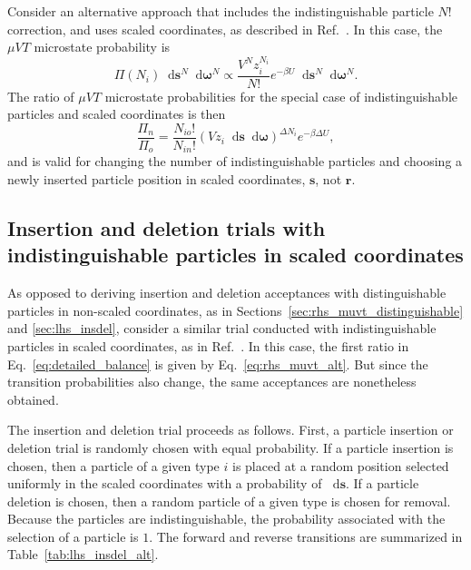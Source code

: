 \documentclass[
  9pt,
  bestpractices,
  pubversion,
]{livecoms}
\newcommand*\diff{\mathop{}\!\mathrm{d}}
\begin{document}
Consider an alternative approach that includes the indistinguishable particle $N!$ correction, and uses scaled coordinates, as described in Ref.~\cite{frenkel_understanding_2002}.
In this case, the $\mu VT$ microstate probability is
\begin{equation}
\Pi(N_i)\diff\mathbf{s}^{N}\diff\boldsymbol{\omega}^{N} \propto \frac{V^{N}z_i^{N_i}}{N!} e^{-\beta U} \diff\mathbf{s}^{N}\diff\boldsymbol{\omega}^{N}.
\end{equation}
The ratio of $\mu VT$ microstate probabilities for the special case of indistinguishable particles and scaled coordinates is then
\begin{equation}
\frac{\Pi_n}{\Pi_o} = \frac{N_{io}!}{N_{in}!}\left(V z_i\diff\mathbf{s}\diff\boldsymbol{\omega}\right)^{\Delta N_i}e^{-\beta\Delta U},
\label{eq:rhs_muvt_alt}
\end{equation}
and is valid for changing the number of indistinguishable particles and choosing a newly inserted particle position in scaled coordinates, $\mathbf{s}$, not $\mathbf{r}$.


\subsection{\label{sec:lhs_insdel_alt}Insertion and deletion trials with indistinguishable particles in scaled coordinates}

As opposed to deriving insertion and deletion acceptances with distinguishable particles in non-scaled coordinates, as in Sections~\ref{sec:rhs_muvt_distinguishable} and \ref{sec:lhs_insdel}, consider a similar trial conducted with indistinguishable particles in scaled coordinates, as in Ref.~\cite{frenkel_understanding_2002}.
In this case, the first ratio in Eq.~\ref{eq:detailed_balance} is given by Eq.~\ref{eq:rhs_muvt_alt}.
But since the transition probabilities also change, the same acceptances are nonetheless obtained.

The insertion and deletion trial proceeds as follows.
First, a particle insertion or deletion trial is randomly chosen with equal probability.
If a particle insertion is chosen, then a particle of a given type $i$ is placed at a random position selected uniformly in the scaled coordinates with a probability of $\diff\mathbf{s}$.
If a particle deletion is chosen, then a random particle of a given type is chosen for removal.
Because the particles are indistinguishable, the probability associated with the selection of a particle is $1$.
The forward and reverse transitions are summarized in Table~\ref{tab:lhs_insdel_alt}.
\end{document}
